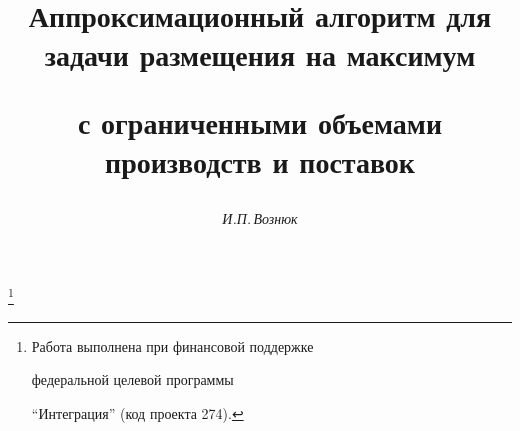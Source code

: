 









\newcommand{\tts}[1]{}







\setcounter{page}{15}















\author{\it И.П.\,Вознюк}




\title{Аппроксимационный алгоритм для задачи размещения на максимум


с ограниченными объемами производств и поставок}


\thanks{Работа выполнена при финансовой поддержке 


федеральной целевой программы


``Интеграция'' (код проекта 274).}





\date{}




\pagestyle{plain} %







\maketitle


